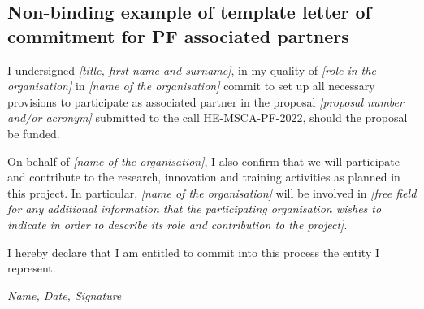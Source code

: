 \documentclass[11pt,draftproposal]{msca-pf-2022}
\begin{document}
\subsection*{Non-binding example of template letter of commitment for PF associated partners}

I undersigned \emph{[title, first name and surname]}, in my quality of
\emph{[role in the organisation]} in \emph{[name of the organisation]} commit
to set up all necessary provisions to participate as associated partner in the
proposal \emph{[proposal number and/or acronym]} submitted to the call
HE-MSCA-PF-2022, should the proposal be funded.

On behalf of \emph{[name of the organisation]}, I also confirm that we will
participate and contribute to the research, innovation and training activities
as planned in this project. In particular, \emph{[name of the organisation]}
will be involved in \emph{[free field for any additional information that the
participating organisation wishes to indicate in order to describe its role and
contribution to the project]}.

I hereby declare that I am entitled to commit into this process the entity I represent.

\hfill \emph{Name, Date, Signature}
\end{document}
